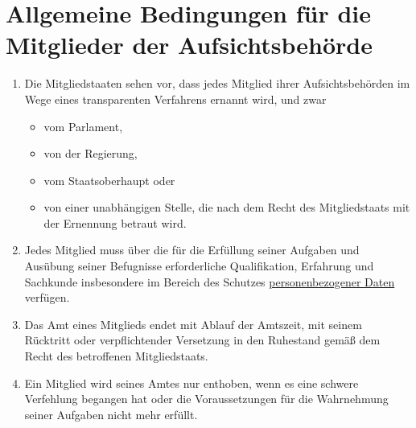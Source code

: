 \chapter{Allgemeine Bedingungen für die Mitglieder der Aufsichtsbehörde}
\label{ch:53}


\begin{enumerate}

  \item Die Mitgliedstaaten sehen vor, dass jedes Mitglied ihrer Aufsichtsbehörden im Wege eines transparenten
   Verfahrens ernannt wird, und zwar
  \label{itm:53-1}

  \begin{itemize}
    \item vom Parlament,
    \item von der Regierung,
    \item vom Staatsoberhaupt oder
    \item von einer unabhängigen Stelle, die nach dem Recht des Mitgliedstaats mit der Ernennung betraut wird.
  \end{itemize}

  \item Jedes Mitglied muss über die für die Erfüllung seiner Aufgaben und Ausübung seiner Befugnisse erforderliche
   Qualifikation, Erfahrung und Sachkunde insbesondere im Bereich des Schutzes \hyperref[itm:04-1]{personenbezogener Daten} verfügen.
  \label{itm:53-2}

  \item Das Amt eines Mitglieds endet mit Ablauf der Amtszeit, mit seinem Rücktritt oder verpflichtender Versetzung in
   den Ruhestand gemäß dem Recht des betroffenen Mitgliedstaats.
  \label{itm:53-3}

  \item Ein Mitglied wird seines Amtes nur enthoben, wenn es eine schwere Verfehlung begangen hat oder die
   Voraussetzungen für die Wahrnehmung seiner Aufgaben nicht mehr erfüllt.
  \label{itm:53-4}

\end{enumerate}


